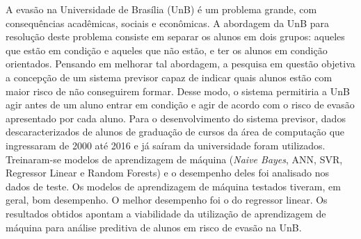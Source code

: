 A evasão na Universidade de Brasília (UnB) é um problema grande, com consequências
acadêmicas, sociais e econômicas. A abordagem da UnB para resolução deste problema
consiste em separar os alunos em dois grupos: aqueles que estão em condição e
aqueles que não estão, e ter os alunos em condição orientados. 
Pensando em melhorar tal abordagem, a pesquisa em questão objetiva a concepção de um
sistema previsor capaz de indicar quais alunos estão com maior risco de não
conseguirem formar.  Desse modo, o sistema permitiria a UnB agir antes de um aluno
entrar em condição e agir de acordo com o risco de evasão apresentado por cada aluno.
Para o desenvolvimento do sistema previsor, dados descaracterizados de alunos de
graduação de cursos da área de computação que
ingressaram de 2000 até 2016 e já saíram da universidade foram utilizados.
Treinaram-se modelos de aprendizagem de máquina (\textit{Naive Bayes}, ANN, SVR, Regressor
Linear e Random Forests) e o desempenho deles foi analisado nos dados de teste. 
Os modelos de aprendizagem de máquina testados tiveram, em geral, bom desempenho. O
melhor desempenho foi o do regressor linear. Os resultados obtidos apontam a
viabilidade da utilização de aprendizagem de máquina para análise preditiva de alunos
em risco de evasão na UnB.

